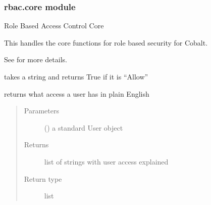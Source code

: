 \documentclass[letterpaper,10pt,english]{sphinxmanual}
\begin{document}
\subsubsection{rbac.core module}
\label{\detokenize{rbac:module-rbac.core}}\label{\detokenize{rbac:rbac-core-module}}
Role Based Access Control Core

This handles the core functions for role based security for Cobalt.

See  for more details.

\begin{fulllineitems}
\label{\detokenize{rbac:rbac.core.allow_to_boolean}}
takes a string and returns True if it is “Allow”

\end{fulllineitems}


\begin{fulllineitems}
\label{\detokenize{rbac:rbac.core.rbac_access_in_english}}
returns what access a user has in plain English
\begin{quote}\begin{description}
\item[{Parameters}] \leavevmode
{} ({\hyperref[\detokenize{accounts:accounts.models.User}]{}}) \textendash{} a standard User object

\item[{Returns}] \leavevmode
list of strings with user access explained

\item[{Return type}] \leavevmode
list

\end{description}\end{quote}

\end{fulllineitems}
\end{document}
